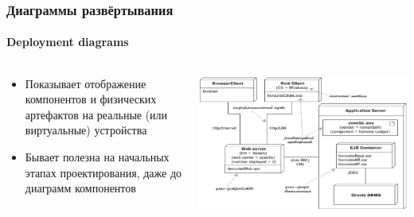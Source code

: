 \documentclass{../../slides-style}
\begin{document}
    \begin{frame}
        \frametitle{Диаграммы развёртывания}
        \framesubtitle{Deployment diagrams}
        \begin{columns}
            \begin{column}{0.5\textwidth}
                \begin{itemize}
                    \item Показывает отображение компонентов и физических артефактов на реальные (или виртуальные) устройства
                    \item Бывает полезна на начальных этапах проектирования, даже до диаграмм компонентов
                \end{itemize}
            \end{column}
            \begin{column}{0.5\textwidth}
                \begin{center}
                    \includegraphics[width=\textwidth]{deploymentDiagram.png}
                \end{center}
            \end{column}
        \end{columns}
    \end{frame}
\end{document}
